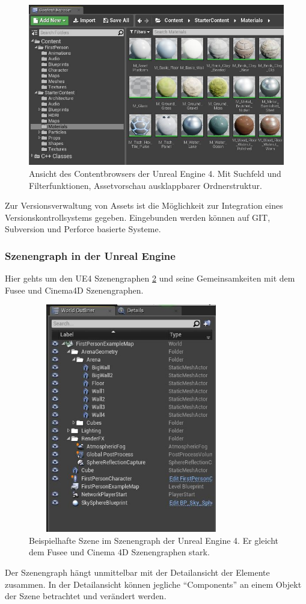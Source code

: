 \documentclass[pagesize, paper=a4, fontsize=12pt, titlepage=true, headings=small, headnosepline, abstractoff, liststotoc, nochapterprefix, plainheadsepline, twoside]{scrreprt}
\begin{document}
\begin{figure}[ht]
	\centering
	\includegraphics[width=\linewidth]{Bilder/UE_Contentbrowser.JPG}
	\caption{Ansicht des Contentbrowsers der Unreal Engine 4. Mit Suchfeld und Filterfunktionen, Assetvorschau ausklappbarer Ordnerstruktur.}
	\label{UEContentbrowser}
\end{figure}

Zur Versionsverwaltung von Assets ist die Möglichkeit zur Integration eines Versionskontrollsystems gegeben. Eingebunden werden können auf GIT, Subversion und Perforce basierte Systeme.

\subsubsection{Szenengraph in der Unreal Engine}
Hier gehts um den UE4 Szenengraphen \ref{UESzenenGraph} und seine Gemeinsamkeiten mit dem Fusee und Cinema4D Szenengraphen.
\begin{figure}[ht]
	\centering
	\includegraphics[width=9cm, height=10cm]{Bilder/UESzenenGraph.JPG}
	\caption{Beispielhafte Szene im Szenengraph der Unreal Engine 4. Er gleicht dem Fusee und Cinema 4D Szenengraphen stark.}
	\label{UESzenenGraph}
\end{figure}
Der Szenengraph hängt unmittelbar mit der Detailansicht der Elemente zusammen. In der Detailansicht können jegliche “Components” an einem Objekt der Szene betrachtet und verändert werden.
\end{document}
